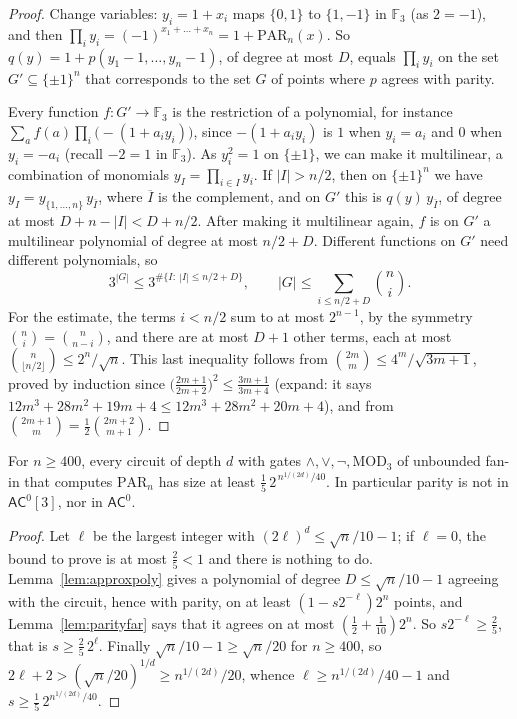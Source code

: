 \begin{proof}
Change variables: $y_i=1+x_i$ maps $\{0,1\}$ to $\{1,-1\}$ in $\mathbb F_3$ (as $2=-1$), and then $\prod_iy_i=(-1)^{x_1+\dots+x_n}=1+\mathrm{PAR}_n(x)$. So $q(y)=1+p(y_1-1,\dots,y_n-1)$, of degree at most $D$, equals $\prod_iy_i$ on the set $G'\subseteq\{\pm1\}^n$ that corresponds to the set $G$ of points where $p$ agrees with parity.

Every function $f:G'\to\mathbb F_3$ is the restriction of a polynomial, for instance $\sum_af(a)\prod_i\bigl(-(1+a_iy_i)\bigr)$, since $-(1+a_iy_i)$ is $1$ when $y_i=a_i$ and $0$ when $y_i=-a_i$ (recall $-2=1$ in $\mathbb F_3$). As $y_i^2=1$ on $\{\pm1\}$, we can make it multilinear, a combination of monomials $y_I=\prod_{i\in I}y_i$. If $|I|>n/2$, then on $\{\pm1\}^n$ we have $y_I=y_{\{1,\dots,n\}}\,y_{\overline I}$, where $\overline I$ is the complement, and on $G'$ this is $q(y)\,y_{\overline I}$, of degree at most $D+n-|I|<D+n/2$. After making it multilinear again, $f$ is on $G'$ a multilinear polynomial of degree at most $n/2+D$. Different functions on $G'$ need different polynomials, so
\[
3^{|G|}\le3^{\#\{I:\ |I|\le n/2+D\}},\qquad |G|\le\sum_{i\le n/2+D}\binom ni.
\]
For the estimate, the terms $i<n/2$ sum to at most $2^{n-1}$, by the symmetry $\binom ni=\binom n{n-i}$, and there are at most $D+1$ other terms, each at most $\binom n{\lfloor n/2\rfloor}\le2^n/\sqrt n$. This last inequality follows from $\binom{2m}m\le4^m/\sqrt{3m+1}$, proved by induction since $\bigl(\frac{2m+1}{2m+2}\bigr)^2\le\frac{3m+1}{3m+4}$ (expand: it says $12m^3+28m^2+19m+4\le12m^3+28m^2+20m+4$), and from $\binom{2m+1}m=\frac12\binom{2m+2}{m+1}$.
\end{proof}

\begin{theorem}\label{thm:rs}
For $n\ge400$, every circuit of depth $d$ with gates $\land,\lor,\lnot,\mathrm{MOD}_3$ of unbounded fan-in that computes $\mathrm{PAR}_n$ has size at least $\frac15\,2^{\,n^{1/(2d)}/40}$. In particular parity is not in $\mathsf{AC}^0[3]$, nor in $\mathsf{AC}^0$.
\end{theorem}

\begin{proof}
Let $\ell$ be the largest integer with $(2\ell)^d\le\sqrt n/10-1$; if $\ell=0$, the bound to prove is at most $\frac25<1$ and there is nothing to do. Lemma~\ref{lem:approxpoly} gives a polynomial of degree $D\le\sqrt n/10-1$ agreeing with the circuit, hence with parity, on at least $(1-s2^{-\ell})2^n$ points, and Lemma~\ref{lem:parityfar} says that it agrees on at most $(\frac12+\frac1{10})2^n$. So $s2^{-\ell}\ge\frac25$, that is $s\ge\frac25\,2^\ell$. Finally $\sqrt n/10-1\ge\sqrt n/20$ for $n\ge400$, so $2\ell+2>(\sqrt n/20)^{1/d}\ge n^{1/(2d)}/20$, whence $\ell\ge n^{1/(2d)}/40-1$ and $s\ge\frac15\,2^{n^{1/(2d)}/40}$.
\end{proof}

